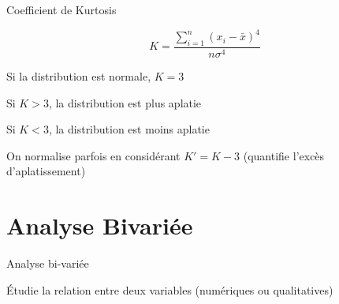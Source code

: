 \documentclass{beamer}
\begin{document}
\begin{frame}{Coefficient de Kurtosis}




$$ K=\frac{\sum_{i=1}^{n}(x_i -\bar{x})^4}{n\sigma^4}$$

Si la distribution est normale, $K= 3$

Si $K>3$, la distribution est \alert{plus aplatie} 

Si $K<3$, la distribution est \alert{moins aplatie} 

On normalise parfois en considérant $K'=K-3$ (quantifie l'excès d'aplatissement)


\end{frame}


\section{Analyse Bivariée}

\begin{frame}{Analyse bi-variée}


Étudie la relation entre \alert{deux} variables (numériques ou qualitatives)




\end{frame}

\end{document}

